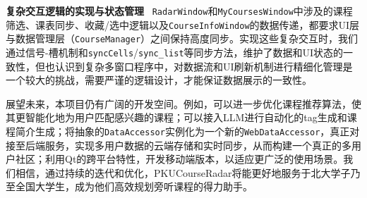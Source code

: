 \documentclass{article}
\begin{document}
\textbf{复杂交互逻辑的实现与状态管理} \ \texttt{RadarWindow}和\texttt{MyCoursesWindow}中涉及的课程筛选、课表同步、收藏/选中逻辑以及\texttt{CourseInfoWindow}的数据传递，都要求UI层与数据管理层（\texttt{CourseManager}）之间保持高度同步。实现这些复杂交互时，我们通过信号-槽机制和\texttt{syncCells}/\texttt{sync\_list}等同步方法，维护了数据和UI状态的一致性，但也认识到复杂多窗口程序中，对数据流和UI刷新机制进行精细化管理是一个较大的挑战，需要严谨的逻辑设计，才能保证数据展示的一致性。

展望未来，本项目仍有广阔的开发空间。例如，可以进一步优化课程推荐算法，使其更智能化地为用户匹配感兴趣的课程；可以接入LLM进行自动化的tag生成和课程简介生成；将抽象的\texttt{DataAccessor}实例化为一个新的\texttt{WebDataAccessor}，真正对接至后端服务，实现多用户数据的云端存储和实时同步，从而构建一个真正的多用户社区；利用Qt的跨平台特性，开发移动端版本，以适应更广泛的使用场景。我们相信，通过持续的迭代和优化，PKUCourseRadar将能更好地服务于北大学子乃至全国大学生，成为他们高效规划旁听课程的得力助手。
\end{document}
